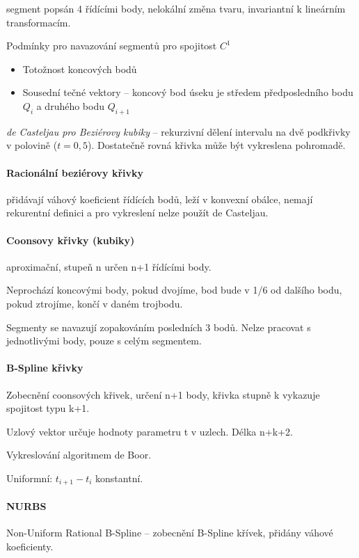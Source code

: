 \documentclass[a4paper, 11pt]{report}
\begin{document}
segment popsán 4 řídícími body, nelokální změna tvaru, invariantní k lineárním transformacím.

Podmínky pro navazování segmentů pro spojitost $C^1$
\begin{itemize}
	\item Totožnost koncových bodů
	\item Sousední tečné vektory -- koncový bod úseku je středem předposledního bodu $Q_i$ a druhého bodu $Q_{i+1}$
\end{itemize}

\emph{de Casteljau pro Beziérovy kubiky} -- rekurzivní dělení intervalu na dvě podkřivky v polovině ($t = 0,5$). Dostatečně rovná křivka může být vykreslena pohromadě.

\paragraph{Racionální beziérovy křivky} přidávají váhový koeficient řídících bodů, leží v konvexní obálce, nemají rekurentní definici a pro vykreslení nelze použít de Casteljau.

\paragraph{Coonsovy křivky (kubiky)} aproximační, stupeň n určen n+1 řídícími body.

Neprochází koncovými body, pokud dvojíme, bod bude v 1/6 od dalšího bodu, pokud ztrojíme, končí v daném trojbodu.

Segmenty se navazují zopakováním posledních 3 bodů. Nelze pracovat s jednotlivými body, pouze s celým segmentem.

\paragraph{B-Spline křivky}

Zobecnění coonsových křivek, určení n+1 body, křivka stupně k vykazuje spojitost typu k+1.

Uzlový vektor určuje hodnoty parametru t v uzlech. Délka n+k+2. 

Vykreslování algoritmem de Boor.

Uniformní: $t_{i+1} - t_i$ konstantní.

\paragraph{NURBS} Non-Uniform Rational B-Spline -- zobecnění B-Spline křívek, přidány váhové koeficienty.
\end{document}
